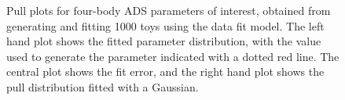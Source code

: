 \begin{figure}
\begin{tabular}{c}
  \end{tabular}
  \caption{Pull plots for four-body ADS parameters of interest, obtained from generating and fitting 1000 toys using the data fit model. The left hand plot shows the fitted parameter distribution, with the value used to generate the parameter indicated with a dotted red line. The central plot shows the fit error, and the right hand plot shows the pull distribution fitted with a Gaussian.}
\label{fig:fourBody_ADS_pulls}
\end{figure}
